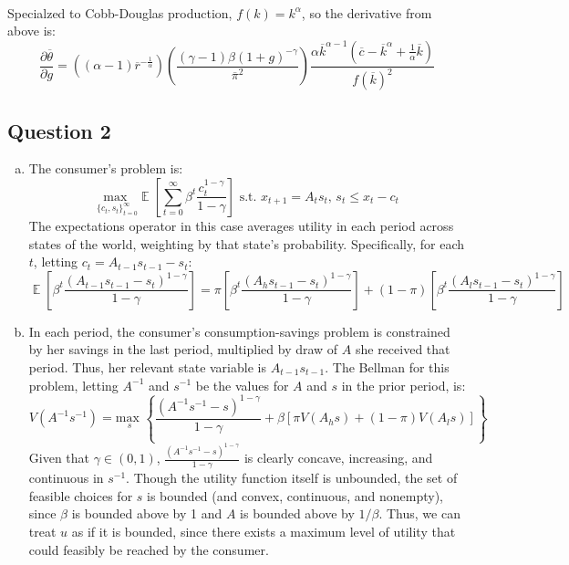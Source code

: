 \documentclass{article}
\newcommand{\usmax}[1]{\underset{#1}{\text{max }}}
\newcommand{\zinf}{_{t=0}^\infty}
\newcommand{\aneg}{A^{-1}}
\newcommand{\sneg}{s^{-1}}
\newcommand{\olk}{\overline{k}}
\newcommand{\olr}{\overline{r}}
\newcommand{\olpi}{\overline{\pi}}
\renewcommand{\sneg}{s^{-1}}
\DeclareMathOperator{\E}{\mathbb{E}} %
\begin{document}
\begin{enumerate}[(a)]
		\medskip \\
		Specialzed to Cobb-Douglas production, ${f(k)=k^\alpha}$, so the derivative from above is:
		\[
			\frac{\partial\overline{\theta}}{\partial g} = \left((\alpha-1)\olr^{-\frac{1}{\alpha}}\right)\left(\frac{(\gamma-1)\beta(1+g)^{-\gamma}}{\olpi^2}\right)\frac{\alpha\olk^{\alpha-1}\left(\overline{c}-\olk^\alpha + \frac{1}{\alpha}\olk\right)}{f(\overline{k})^2}
		\]
\end{enumerate}

\subsection*{Question 2}

\begin{enumerate}[(a)]
	\item The consumer's problem is:
		\[
			\usmax{\{c_t,s_t\}\zinf}\E\left[\sum\zinf\beta^t\frac{c_t^{1-\gamma}}{1-\gamma}\right]\text{ s.t. }x_{t+1}= A_ts_t\text{, }s_t\leq x_t-c_t
		\]
		The expectations operator in this case averages utility in each period across states of the world, weighting by that state's probability. Specifically, for each $t$, letting $c_t = A_{t-1}s_{t-1} - s_t$:
		\[
			\E\left[\beta^t\frac{(A_{t-1}s_{t-1} - s_t)^{1-\gamma}}{1-\gamma}\right] = \pi\left[\beta^t\frac{(A_hs_{t-1} - s_t)^{1-\gamma}}{1-\gamma}\right] + (1-\pi)\left[\beta^t\frac{(A_ls_{t-1} - s_t)^{1-\gamma}}{1-\gamma}\right] 
		\]
		
	\item In each period, the consumer's consumption-savings problem is constrained by her savings in the last period, multiplied by draw of $A$ she received that period. Thus, her relevant state variable is $A_{t-1}s_{t-1}$. The Bellman for this problem, letting $A^{-1}$ and $s^{-1}$ be the values for $A$ and $s$ in the prior period, is:
		\[
			V(A^{-1}s^{-1}) = \usmax{s}\left\{ \frac{\left(\aneg\sneg-s\right)^{1-\gamma}}{1-\gamma} + \beta\left[\pi V(A_hs) + (1-\pi)V(A_ls)\right] \right\}
		\]
		Given that $\gamma\in(0,1)$, $\frac{\left(\aneg\sneg-s\right)^{1-\gamma}}{1-\gamma}$ is clearly concave, increasing, and continuous in $\sneg$. Though the utility function itself is unbounded, the set of feasible choices for $s$ is bounded (and convex, continuous, and nonempty), since $\beta$ is bounded above by 1 and $A$ is bounded above by $1/\beta$. Thus, we can treat $u$ as if it is bounded, since there exists a maximum level of utility that could feasibly be reached by the consumer.
	

\end{enumerate}
\end{document}
